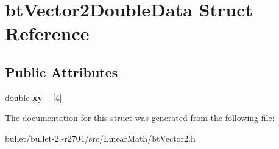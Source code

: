 \hypertarget{structbt_vector2_double_data}{\section{bt\+Vector2\+Double\+Data Struct Reference}
\label{structbt_vector2_double_data}
}
\subsection*{Public Attributes}
\begin{DoxyCompactItemize}
\item 
\hypertarget{structbt_vector2_double_data_a22a4550a7773b4868534e01bb791f8b2}{double {\bfseries xy\+\_\+} \mbox{[}4\mbox{]}}\label{structbt_vector2_double_data_a22a4550a7773b4868534e01bb791f8b2}

\end{DoxyCompactItemize}


The documentation for this struct was generated from the following file\+:\begin{DoxyCompactItemize}
\item 
bullet/bullet-\/2.-\/r2704/src/\+Linear\+Math/bt\+Vector2.\+h\end{DoxyCompactItemize}
